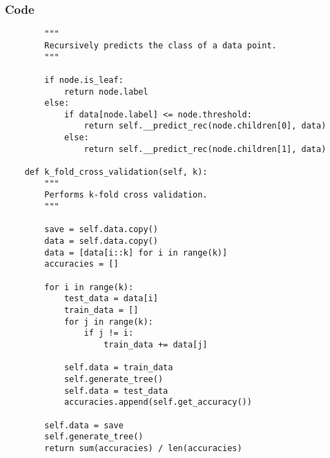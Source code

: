 \documentclass{beamer}
\begin{document}
\begin{frame}[t, fragile]
    \frametitle{Code}
    \fontsize{3pt}{5pt}\selectfont
    \begin{verbatim}
        """
        Recursively predicts the class of a data point.
        """

        if node.is_leaf:
            return node.label
        else:
            if data[node.label] <= node.threshold:
                return self.__predict_rec(node.children[0], data)
            else:
                return self.__predict_rec(node.children[1], data)
            
    def k_fold_cross_validation(self, k):
        """
        Performs k-fold cross validation.
        """
        
        save = self.data.copy()
        data = self.data.copy()
        data = [data[i::k] for i in range(k)]
        accuracies = []
        
        for i in range(k):
            test_data = data[i]
            train_data = []
            for j in range(k):
                if j != i:
                    train_data += data[j]
            
            self.data = train_data
            self.generate_tree()
            self.data = test_data
            accuracies.append(self.get_accuracy())
            
        self.data = save
        self.generate_tree()
        return sum(accuracies) / len(accuracies)
    \end{verbatim}
\end{frame}

\end{document}
